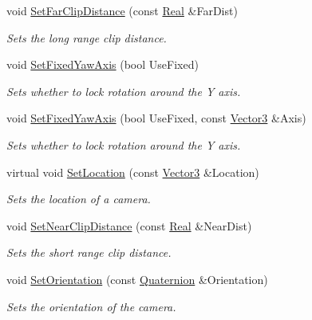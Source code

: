 \begin{DoxyCompactItemize}
void \hyperlink{classphys_1_1Camera_a77f0fa5cb6b934cfda8f5143afae3a0e}{SetFarClipDistance} (const \hyperlink{namespacephys_af7eb897198d265b8e868f45240230d5f}{Real} \&FarDist)
\begin{DoxyCompactList}\small\item\em Sets the long range clip distance. \item\end{DoxyCompactList}\item 
void \hyperlink{classphys_1_1Camera_a1b4d5be85c528541c7a1cbebb41bfd89}{SetFixedYawAxis} (bool UseFixed)
\begin{DoxyCompactList}\small\item\em Sets whether to lock rotation around the Y axis. \item\end{DoxyCompactList}\item 
void \hyperlink{classphys_1_1Camera_aa6d7285b7a3fc43e3c6dd05ff30f89ab}{SetFixedYawAxis} (bool UseFixed, const \hyperlink{classphys_1_1Vector3}{Vector3} \&Axis)
\begin{DoxyCompactList}\small\item\em Sets whether to lock rotation around the Y axis. \item\end{DoxyCompactList}\item 
virtual void \hyperlink{classphys_1_1Camera_afd2a77e96dd6d0dec1071dcc3229425f}{SetLocation} (const \hyperlink{classphys_1_1Vector3}{Vector3} \&Location)
\begin{DoxyCompactList}\small\item\em Sets the location of a camera. \item\end{DoxyCompactList}\item 
void \hyperlink{classphys_1_1Camera_a0fdf28666baba46e907d6a8eac714915}{SetNearClipDistance} (const \hyperlink{namespacephys_af7eb897198d265b8e868f45240230d5f}{Real} \&NearDist)
\begin{DoxyCompactList}\small\item\em Sets the short range clip distance. \item\end{DoxyCompactList}\item 
void \hyperlink{classphys_1_1Camera_adbfa4a59eb09c0578c9aac792b78ef55}{SetOrientation} (const \hyperlink{classphys_1_1Quaternion}{Quaternion} \&Orientation)
\begin{DoxyCompactList}\small\item\em Sets the orientation of the camera. \item\end{DoxyCompactList}\item 

\end{DoxyCompactItemize}
